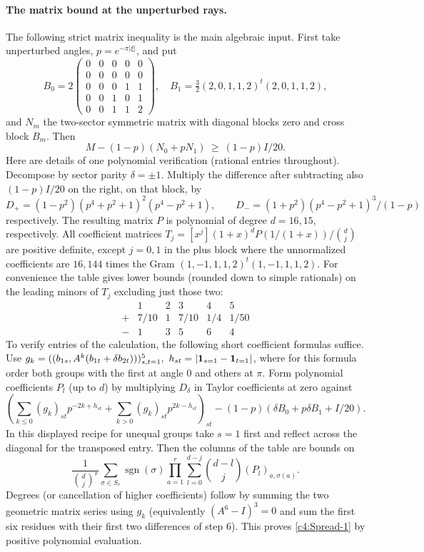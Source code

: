 \paragraph{The matrix bound at the unperturbed rays.} The following strict matrix inequality is the main algebraic input. First take unperturbed angles, \(p=e^{-\pi|\xi|}\), and put
\[
 B_0=2\begin{pmatrix}
 0&0&0&0&0\\0&0&0&0&0\\0&0&0&1&1\\0&0&1&0&1\\0&0&1&1&2
 \end{pmatrix},\quad B_1=\tfrac32(2,0,1,1,2)^t(2,0,1,1,2),
\]
and \(N_m\) the two-sector symmetric matrix with diagonal blocks zero and cross block \(B_m\). Then
\begin{equation}
 M-(1-p)(N_0+pN_1)\ \ge\ (1-p) I/20.                                      \label{c4:Spread-1}
\end{equation}
Here are details of one polynomial verification (rational entries throughout). Decompose by sector parity \(\delta=\pm1\). Multiply the difference after subtracting also \((1-p)I/20\) on the right, on that block, by
\[
 D_+=(1-p^2)(p^4+p^2+1)^2(p^4-p^2+1),\qquad
 D_-=(1+p^2)(p^4-p^2+1)^3/(1-p)
\]
respectively. The resulting matrix \(P\) is polynomial of degree \(d=16,15\), respectively. All coefficient matrices \(T_j=[x^j](1+x)^d P(1/(1+x))/\binom dj\) are positive definite, except \(j=0,1\) in the plus block where the unnormalized coefficients are \(16,144\) times the Gram \((1,-1,1,1,2)^t(1,-1,1,1,2)\). For convenience the table gives lower bounds (rounded down to simple rationals) on the leading minors of \(T_j\) excluding just those two:
\[
 \begin{array}{c|ccccc}
  &1&2&3&4&5\\\hline
 +&7/10&1&7/10&1/4&1/50\\
 -&1&3&5&6&4
 \end{array}
\]
To verify entries of the calculation, the following short coefficient formulas suffice. Use \(g_k=((b_{1s},A^k(b_{1t}+\delta b_{2t})))_{s,t=1}^5,\ h_{st}=|{\bf1}_{s=1}-{\bf1}_{t=1}|\), where for this formula order both groups with the first at angle 0 and others at \(\pi\). Form polynomial coefficients \(P_l\) (up to \(d\)) by multiplying \(D_\delta\) in Taylor coefficients at zero against
\[
 \left(\sum_{k\le0}(g_k)_{st}p^{-2k+h_{st}}
       +\sum_{k>0}(g_k)_{st}p^{2k-h_{st}}\right)_{st}
       -(1-p)(\delta B_0+p\delta B_1+I/20).
\]
In this displayed recipe for unequal groups take \(s=1\) first and reflect across the diagonal for the transposed entry. Then the columns of the table are bounds on
\[
 \frac{1}{\binom dj^r}\sum_{\sigma\in S_r}\operatorname{sgn}(\sigma)
 \prod_{a=1}^r\sum_{l=0}^{d-j}\binom{d-l}{j}(P_l)_{a,\sigma(a)}.
\]
Degrees (or cancellation of higher coefficients) follow by summing the two geometric matrix series using \(g_k\) (equivalently \((A^6-I)^3=0\) and sum the first six residues with their first two differences of step 6). This proves \eqref{c4:Spread-1} by positive polynomial evaluation.

